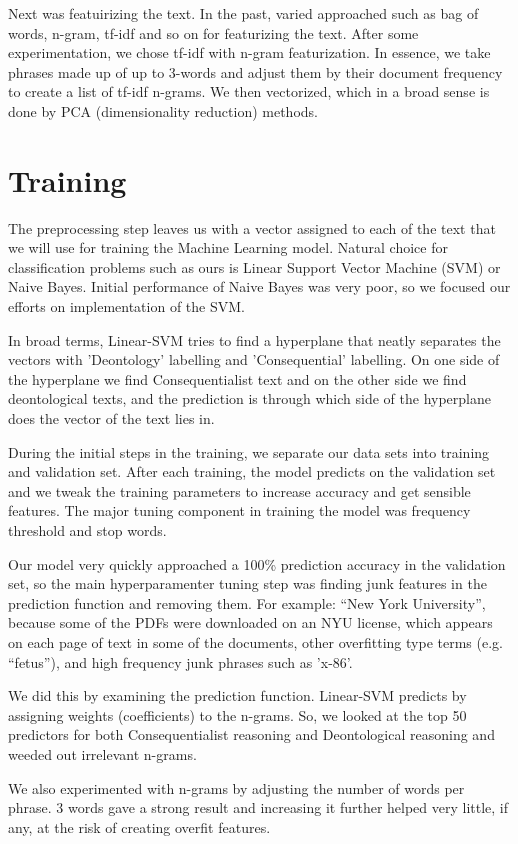 \documentclass{article}
\begin{document}
Next was featuirizing the text. In the past, varied approached such as bag of words, n-gram, tf-idf and so on for featurizing the text. After some experimentation, we chose tf-idf with n-gram featurization. In essence, we take phrases made up of up to 3-words and adjust them by their document frequency to create a list of tf-idf n-grams. We then vectorized, which in a broad sense is done by PCA (dimensionality reduction) methods. 
\section{Training}
The preprocessing step leaves us with a vector assigned to each of the text that we will use for training the Machine Learning model. Natural choice for classification problems such as ours is Linear Support Vector Machine (SVM) or Naive Bayes. Initial performance of Naive Bayes was very poor, so we focused our efforts on implementation of the SVM.

In broad terms, Linear-SVM tries to find a hyperplane that neatly separates the vectors with 'Deontology' labelling and 'Consequential' labelling. On one side of the hyperplane we find Consequentialist text and on the other side we find deontological texts, and the prediction is through which side of the hyperplane does the vector of the text lies in. 

During the initial steps in the training, we separate our data sets into training and validation set. After each training, the model predicts on the validation set and we tweak the training parameters to increase accuracy and get sensible features. The major tuning component in training the model was frequency threshold and stop words. 

Our model very quickly approached a 100\% prediction accuracy in the validation set, so the main hyperparamenter tuning step was finding junk features in the prediction function and removing them. For example: “New York University”, because some of the PDFs were downloaded on an NYU license, which appears on each page of text in some of the documents, other overfitting type terms (e.g. “fetus”), and high frequency junk phrases such as 'x-86'. 

We did this by examining the prediction function. Linear-SVM predicts by assigning weights (coefficients) to the n-grams. So, we looked at the top 50 predictors for both Consequentialist reasoning and Deontological reasoning and weeded out irrelevant n-grams. 

We also experimented with n-grams by adjusting the number of words per phrase. 3 words gave a strong result and increasing it further helped very little, if any, at the risk of creating overfit features.
\end{document}
